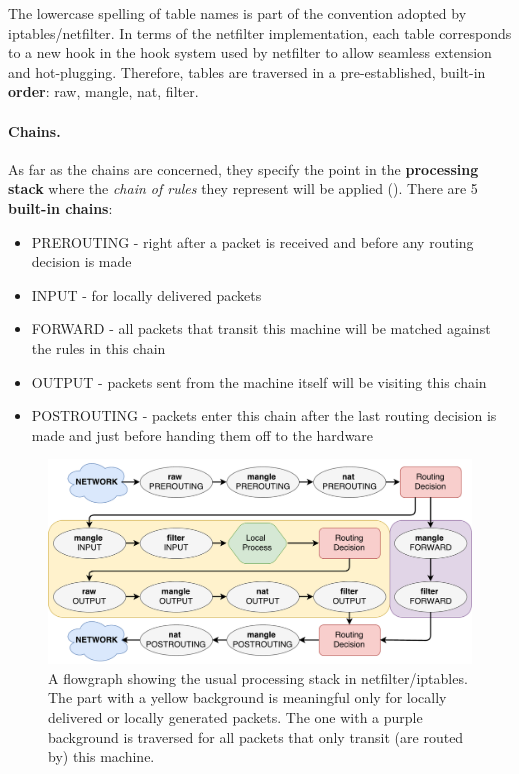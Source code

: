 The lowercase spelling of table names is part of the convention adopted by
iptables/netfilter.  In terms of the netfilter implementation, each table
corresponds to a new hook in the hook system used by netfilter to allow
seamless extension and hot-plugging.  Therefore, tables are traversed in a
pre-established, built-in \textbf{order}: raw, mangle, nat, filter.

\paragraph{Chains.}
As far as the chains are concerned, they specify the point in the
\textbf{processing stack} where the \emph{chain of rules} they represent will
be applied ().  There are 5
\textbf{built-in chains}:
\begin{itemize}
  \item PREROUTING - right after a packet is received and before any routing
    decision is made
  \item INPUT - for locally delivered packets
  \item FORWARD - all packets that transit this machine will be matched against
    the rules in this chain
  \item OUTPUT - packets sent from the machine itself will be visiting this
    chain
  \item POSTROUTING - packets enter this chain after the last routing decision
    is made and just before handing them off to the hardware
\end{itemize}

\begin{figure}[h]
  \centering
  \captionsetup{justification=centering}
  \includegraphics[scale=0.5]{src/img/iptables-organization}
  \caption[A flowgraph showing the processing stack in netfilter/iptables.]{A
  flowgraph showing the usual processing stack in netfilter/iptables. The part
  with a yellow background is meaningful only for locally delivered or locally
  generated packets. The one with a purple background is traversed for all
  packets that only transit (are routed by) this machine.}
  \label{fig:iptables-organization}
\end{figure}

